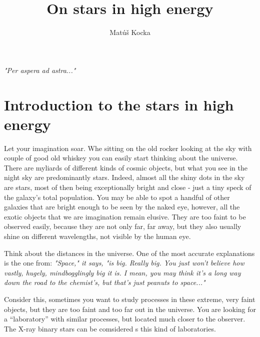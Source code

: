 \documentclass[oneside,a4paper,11pt]{report}
\title{On stars in high energy }
\author{Matúš Kocka}
\begin{document}

\newpage
\textit{"Per aspera ad astra..."}

\pagebreak
\tableofcontents

\chapter{Introduction to the stars in high energy }

Let your imagination soar. 
Whe sitting on the old rocker looking at the sky with couple of good old whiskey you can easily 
start thinking about the universe. 
There are myliards of different kinds of cosmic objects, but what you see in the night sky are predominantly stars.
Indeed, almost all the shiny dots in the sky are stars, most of then being exceptionally bright and close - just a tiny
speck of the galaxy's total population. You may be able to spot a handful of other galaxies that are bright enough to 
be seen by the naked eye, however, all the exotic objects that we are imagination remain elusive.  
They are too faint to be observed easily, because they are not only far, far away, but they also usually shine 
on different wavelengths, not visible by the human eye.

Think about the distances in the universe. One of the most accurate explanations is the one from: \cite{hitch:1}  
\textit{"Space," it says, "is big. Really big. You just won't believe how vastly, 
hugely, mindbogglingly big it is. I mean, you may think it's a long way down the road to the 
chemist's, but that's just peanuts to space..."} 

Consider this, sometimes you want to study processes in these extreme, very faint objects, 
but they are too faint and too far out in the universe. You are looking for a “laboratory” with similar
 processes, but located much closer to the observer. The X-ray binary stars can be comsidered s this kind of 
laboratories.  
\end{document}
